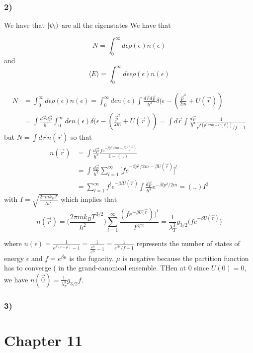 \documentclass[10pt,a4paper]{book}
\begin{document}
\subsection*{2)}
We have that $\ket{\psi_i}$ are all the eigenstates
We have that 

$$N=\int_{0}^{\infty}d\epsilon \rho(\epsilon)n(\epsilon)$$
and 
$$
\langle E\rangle=\int_{0}^{\infty} d\epsilon\epsilon\rho(\epsilon)n(\epsilon)$$

\begin{align*}
N&=\int_{0}^{\infty}d\epsilon \rho(\epsilon)n(\epsilon)=\int_0^{\infty} d\epsilon n(\epsilon) \int\frac{d\vec{r}d\vec{p}}{h^3}\delta(\epsilon-(\frac{\vec{p}^2}{2m}+U(\vec{r}))\\
&=\int\frac{d\vec{r}d\vec{p}}{h^3}\int_0^{\infty}d\epsilon n(\epsilon)\delta(\epsilon-(\frac{\vec{p}^2}{2m}+U(\vec{r}))=\int d\vec{r}\int\frac{d\vec{p}}{h^3} \frac{1}{e^{\beta(p^2/2m+U(\vec{r}))}/f-1}
\end{align*}
but $N=\int d\vec{r}n(\vec{r})$ so that
\begin{align*}
n(\vec{r})&=\int\frac{d\vec{p}}{h^3}\frac{fe^{-\beta p^2/2m-\beta U(\vec{r})}}{1-(..)}\\
&=\int\frac{d\vec{p}}{h^3}\sum_{l=1}^{\infty}\bigg[fe^{-\beta p^2/2m-\beta U(\vec{r})}\bigg]^l\\
&=\sum_{l=1}^{\infty}f^le^{-\beta lU(\vec{r})}\int\frac{d\vec{p}}{h^3}e^{-\beta lp^2/2m}=(..)I^3
\end{align*}
with $I=\sqrt{\frac{2\pi m k_BT}{lh^2}}$ which implies that 
$$n(\vec{r})=\bigg(\frac{2\pi mk_BT}{h^2}^{3/2}\bigg)\sum_{l=1}^{\infty}\frac{(fe^{-\beta U(\vec{r}}))^l}{l^{3/2}}=\frac{1}{\lambda_T^3}g_{3/2}\bigg(fe^{-\beta U(\vec{r})}\bigg)$$



where $n(\epsilon)=\frac{1}{e^{\beta(\epsilon-\mu)}-1}=\frac{1}{\frac{e^{\beta\epsilon}}{e^{\beta\mu}}-1}=\frac{1}{e^{\beta\epsilon}/f-1}$ represents the number of states of energy $\epsilon$ and $f=e^{\beta\mu}$ is the fugacity. $\mu$ is negative because the partition function has to converge ( in the grand-canonical ensemble. 
THen at $0$ since $U(0)=0$, we have $n(\vec{0})=\frac{1}{\lambda_T^3}g_{3/2}f$. 
 
 
\subsection*{3)}





\chapter*{Chapter 11}
\end{document}
